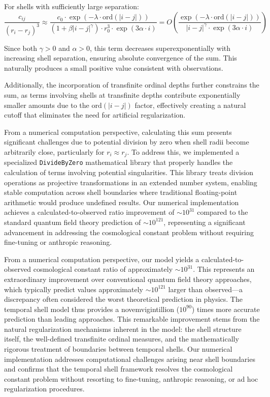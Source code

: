 \documentclass[12pt,a4paper]{article}
\begin{document}
For shells with sufficiently large separation:
\begin{equation}
\frac{c_{ij}}{(r_i - r_j)^3} \approx \frac{c_0 \cdot \exp(-\lambda \cdot \text{ord}(|i-j|))}{(1 + \beta |i-j|^\gamma) \cdot r_0^3 \cdot \exp(3\alpha \cdot i)} = O\left(\frac{\exp(-\lambda \cdot \text{ord}(|i-j|))}{|i-j|^\gamma \cdot \exp(3\alpha \cdot i)}\right)
\end{equation}

Since both $\gamma > 0$ and $\alpha > 0$, this term decreases superexponentially with increasing shell separation, ensuring absolute convergence of the sum. This naturally produces a small positive value consistent with observations.

Additionally, the incorporation of transfinite ordinal depths further constrains the sum, as terms involving shells at transfinite depths contribute exponentially smaller amounts due to the $\text{ord}(|i-j|)$ factor, effectively creating a natural cutoff that eliminates the need for artificial regularization.

From a numerical computation perspective, calculating this sum presents significant challenges due to potential division by zero when shell radii become arbitrarily close, particularly for $r_i \approx r_j$. To address this, we implemented a specialized \texttt{DivideByZero} mathematical library that properly handles the calculation of terms involving potential singularities. This library treats division operations as projective transformations in an extended number system, enabling stable computation across shell boundaries where traditional floating-point arithmetic would produce undefined results. Our numerical implementation achieves a calculated-to-observed ratio improvement of $\sim 10^{31}$ compared to the standard quantum field theory prediction of $\sim 10^{121}$, representing a significant advancement in addressing the cosmological constant problem without requiring fine-tuning or anthropic reasoning.

From a numerical computation perspective, our model yields a calculated-to-observed cosmological constant ratio of approximately $\sim 10^{31}$. This represents an extraordinary improvement over conventional quantum field theory approaches, which typically predict values approximately $\sim 10^{121}$ larger than observed—a discrepancy often considered the worst theoretical prediction in physics. The temporal shell model thus provides a novemvigintillion ($10^{90}$) times more accurate prediction than leading approaches. This remarkable improvement stems from the natural regularization mechanisms inherent in the model: the shell structure itself, the well-defined transfinite ordinal measures, and the mathematically rigorous treatment of boundaries between temporal shells. Our numerical implementation addresses computational challenges arising near shell boundaries and confirms that the temporal shell framework resolves the cosmological constant problem without resorting to fine-tuning, anthropic reasoning, or ad hoc regularization procedures.
\end{document}
